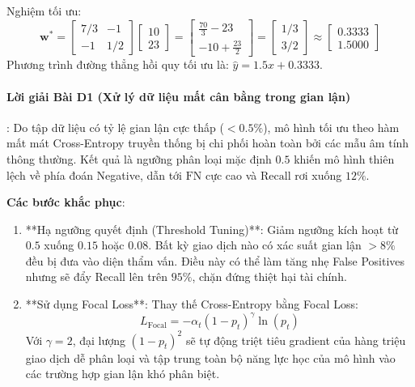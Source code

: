 \begin{itemize}
\begin{equation*}
  \end{equation*}
  Nghiệm tối ưu:
  \begin{equation*}
  \mathbf{w}^* = \begin{bmatrix} 7/3 & -1 \\ -1 & 1/2 \end{bmatrix} \begin{bmatrix} 10 \\ 23 \end{bmatrix} = \begin{bmatrix} \frac{70}{3} - 23 \\ -10 + \frac{23}{2} \end{bmatrix} = \begin{bmatrix} 1/3 \\ 3/2 \end{bmatrix} \approx \begin{bmatrix} 0.3333 \\ 1.5000 \end{bmatrix}
  \end{equation*}
  Phương trình đường thẳng hồi quy tối ưu là: $\hat{y} = 1.5 x + 0.3333$.
\end{itemize}

\paragraph{Lời giải Bài D1 (Xử lý dữ liệu mất cân bằng trong gian lận)}:
Do tập dữ liệu có tỷ lệ gian lận cực thấp ($< 0.5\%$), mô hình tối ưu theo hàm mất mát Cross-Entropy truyền thống bị chi phối hoàn toàn bởi các mẫu âm tính thông thường. Kết quả là ngưỡng phân loại mặc định $0.5$ khiến mô hình thiên lệch về phía đoán Negative, dẫn tới $\text{FN}$ cực cao và $\text{Recall}$ rơi xuống $12\%$.

\textbf{Các bước khắc phục}:
\begin{enumerate}
  \item **Hạ ngưỡng quyết định (Threshold Tuning)**: Giảm ngưỡng kích hoạt từ $0.5$ xuống $0.15$ hoặc $0.08$. Bất kỳ giao dịch nào có xác suất gian lận $> 8\%$ đều bị đưa vào diện thẩm vấn. Điều này có thể làm tăng nhẹ False Positives nhưng sẽ đẩy Recall lên trên $95\%$, chặn đứng thiệt hại tài chính.
  \item **Sử dụng Focal Loss**: Thay thế Cross-Entropy bằng Focal Loss:
  \begin{equation*}
  L_{\text{Focal}} = - \alpha_t (1 - p_t)^\gamma \ln(p_t)
  \end{equation*}
  Với $\gamma = 2$, đại lượng $(1 - p_t)^2$ sẽ tự động triệt tiêu gradient của hàng triệu giao dịch dễ phân loại và tập trung toàn bộ năng lực học của mô hình vào các trường hợp gian lận khó phân biệt.
\end{enumerate}
